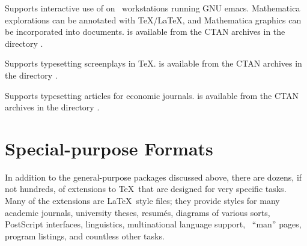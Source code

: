\begin{iplist}{.25in}
    Supports interactive use of  on \Unix\
    workstations running GNU emacs.  Mathematica explorations can be annotated
    with \TeX/\LaTeX, and Mathematica graphics can be incorporated
    into documents.   is available from the CTAN archives in
    the directory \ctandir{macros/mathematica}.


    Supports typesetting screenplays in \TeX.
     is 
    available from the CTAN archives in the directory
    .


    Supports typesetting articles for economic journals.
     is available 
    from the CTAN archives in the directory
    .
\end{iplist}

%
%
%
%
%

\section{Special-purpose Formats}

In addition to the general-purpose packages  discussed above,
there are dozens, if not hundreds, of extensions to \TeX\ that are
designed for very specific tasks.  Many of the extensions are
\LaTeX\ style files; they provide styles for many academic journals,
university theses, resum\'es, diagrams of various sorts, PostScript
interfaces, linguistics, multinational language support, \Unix\  
``man'' pages, program listings, and countless other tasks.

